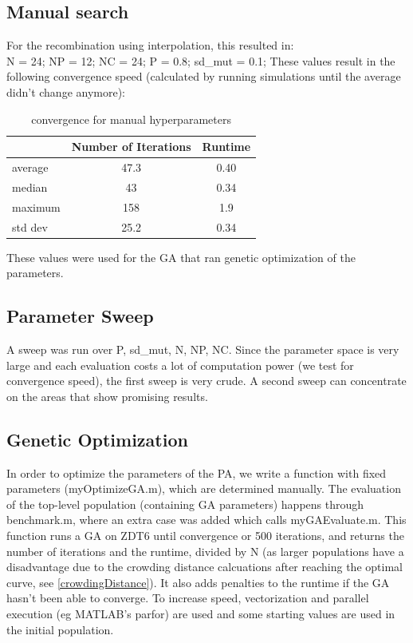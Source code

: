 \subsection{Manual search}
For the recombination using interpolation, this resulted in:\\
N = 24;         %
NP = 12;       %
NC = 24;       %
P = 0.8;	%
sd_mut = 0.1; %
These values result in the following convergence speed (calculated by running simulations until the average didn't change anymore):
\begin{table}[H]
\centering
\begin{tabular}{|l|c|c| }
\hline
& Number of Iterations	& Runtime \\
\hline
average    &      47.3   &   0.40 \\
median      &     43      &      0.34    \\
maximum		&	 158      &     1.9  \\
std dev  &   25.2   &   0.34   \\
\hline
\end{tabular}
\caption{convergence for manual hyperparameters}
\label{manualConvergence}
\end{table}
These values were used for the GA that ran genetic optimization of the parameters.

\subsection{Parameter Sweep}
A sweep was run over P, sd_mut, N, NP, NC. Since the parameter space is very large and each evaluation costs a lot of computation power (we test for convergence speed), the first sweep is very crude.
A second sweep can concentrate on the areas that show promising results.

\subsection{Genetic Optimization} 
In order to optimize the parameters of the PA, we write a function with fixed parameters (myOptimizeGA.m), which are determined manually.
The evaluation of the top-level population (containing GA parameters) happens through benchmark.m, where an extra case was added which calls myGAEvaluate.m.
This function runs a GA on ZDT6 until convergence or 500 iterations, and returns the number of iterations and the runtime, divided by N (as larger populations have a disadvantage due to the crowding distance calcuations after reaching the optimal curve, see \ref{crowdingDistance}). It also adds penalties to the runtime if the GA hasn't been able to converge.
To increase speed, vectorization and parallel execution (eg MATLAB's parfor) are used and some starting values are used in the initial population. \\

